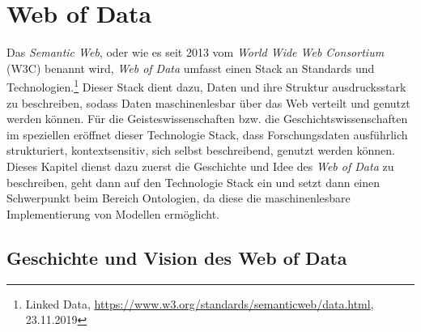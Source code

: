 \documentclass[12pt,a4paper]{article}
\begin{document}
\newpage
\section{Web of Data}
\label{WebofData}
Das \textit{Semantic Web}, oder wie es seit 2013 vom \textit{World Wide Web Consortium} (W3C) benannt wird, \textit{Web of Data} umfasst einen Stack an Standards und Technologien.\footnote{Linked Data, \url{https://www.w3.org/standards/semanticweb/data.html}, 23.11.2019} Dieser Stack dient dazu, Daten und ihre Struktur ausdrucksstark zu beschreiben, sodass Daten maschinenlesbar über das Web verteilt und genutzt werden können. Für die Geisteswissenschaften bzw. die Geschichtswissenschaften im speziellen eröffnet dieser Technologie Stack, dass Forschungsdaten ausführlich strukturiert, kontextsensitiv, sich selbst beschreibend, genutzt werden können.
\\
Dieses Kapitel dienst dazu zuerst die Geschichte und Idee des \textit{Web of Data} zu beschreiben, geht dann auf den Technologie Stack ein und setzt dann einen Schwerpunkt beim Bereich Ontologien, da diese die maschinenlesbare Implementierung von Modellen ermöglicht.

\subsection{Geschichte und Vision des Web of Data}
\end{document}
